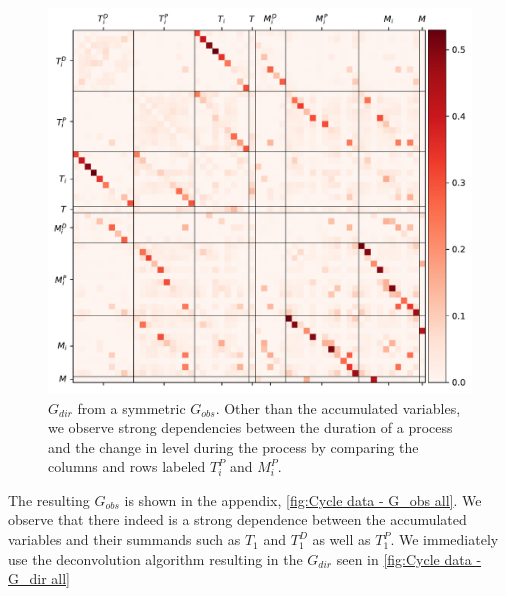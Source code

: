 \documentclass[../Thesis.tex]{subfiles}
\begin{document}
\begin{figure}[ht]
    \centering
    \includegraphics[width = .9\linewidth]{figures/Cycle data/G_dir complete - symmetric.pdf}
    \caption{$G_{dir}$ from a symmetric $G_{obs}$. Other than the accumulated variables, we observe strong dependencies between the duration of a process and the change in level during the process by comparing the columns and rows labeled $T^P_i$ and $M^P_i$.}
    \label{fig:Cycle data - G_dir all}
\end{figure}

The resulting $G_{obs}$ is shown in the appendix, \autoref{fig:Cycle data - G_obs all}. We observe that there indeed is a strong dependence between the accumulated variables and their summands such as $T_1$ and $T^D_1$ as well as $T^P_1$. We immediately use the deconvolution algorithm resulting in the $G_{dir}$ seen in \autoref{fig:Cycle data - G_dir all}
\end{document}

